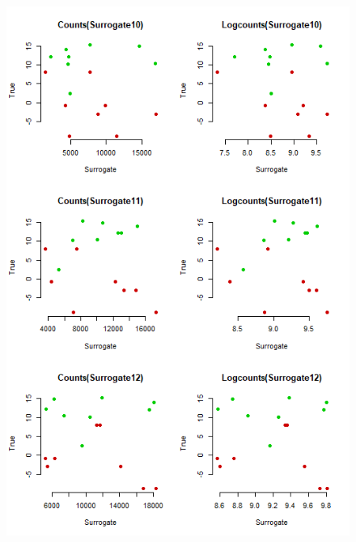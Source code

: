 \documentclass[a4paper,12pt]{article}
\begin{document}
	\begin{figure}[H]
		\begin{minipage}{0.5\textwidth}
			\includegraphics[scale=0.45]{exploration-4.png}
		\end{minipage}
		\begin{minipage}{0.5\textwidth}

\end{minipage}
\end{figure}
\end{document}
